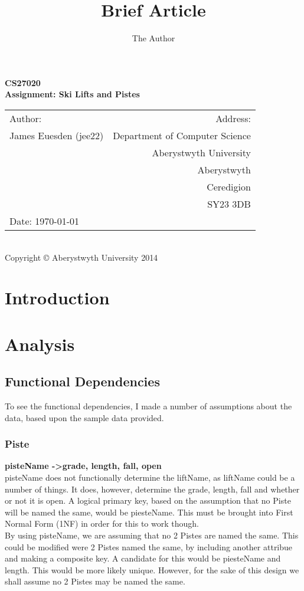 \documentclass[11pt]{scrartcl} %
\title{Brief Article}
\author{The Author}
\begin{document}
\newpage

\begin{center}
\textbf{\LARGE CS27020}\\[0.5cm]

\textbf{\LARGE Assignment: Ski Lifts and Pistes }\\[13cm]

\begin{tabular}{ l | r }
{\large Author:} & {\large Address:} \\
James Euesden (jee22) &  Department of Computer Science \\
 & Aberystwyth University \\ 
 & Aberystwyth \\
 & Ceredigion \\
 & SY23 3DB \\
{\large Date:} \today  &  \\

\end{tabular} \\[0.2cm]

{\small Copyright © Aberystwyth University 2014}

\end{center}



\newpage

\section{Introduction}
\section{Analysis}
\subsection{Functional Dependencies}
To see the functional dependencies, I made a number of assumptions about the data, based upon the sample data provided.
\subsubsection{Piste}
 \textbf{pisteName -\textgreater  grade, length, fall, open}
\\[0.1cm]
pisteName does not functionally determine the liftName, as liftName could be a number of things. It does, however, determine the grade, length, fall and whether or not it is open. A logical primary key, based on the assumption that no Piste will be named the same, would be piesteName. This must be brought into First Normal Form (1NF) in order for this to work though.\\
By using pisteName, we are assuming that no 2 Pistes are named the same. This could be modified were 2 Pistes named the same, by including another attribue and making a composite key. A candidate for this would be piesteName and length. This would be more likely unique. However, for the sake of this design we shall assume no 2 Pistes may be named the same.
\end{document}
